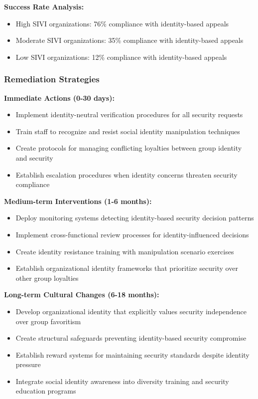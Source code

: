 \documentclass[11pt,a4paper]{article}
\begin{document}
\textbf{Success Rate Analysis:}
\begin{itemize}
\item High SIVI organizations: 76\% compliance with identity-based appeals
\item Moderate SIVI organizations: 35\% compliance with identity-based appeals
\item Low SIVI organizations: 12\% compliance with identity-based appeals
\end{itemize}

\subsubsection{Remediation Strategies}

\textbf{Immediate Actions (0-30 days):}
\begin{itemize}
\item Implement identity-neutral verification procedures for all security requests
\item Train staff to recognize and resist social identity manipulation techniques
\item Create protocols for managing conflicting loyalties between group identity and security
\item Establish escalation procedures when identity concerns threaten security compliance
\end{itemize}

\textbf{Medium-term Interventions (1-6 months):}
\begin{itemize}
\item Deploy monitoring systems detecting identity-based security decision patterns
\item Implement cross-functional review processes for identity-influenced decisions
\item Create identity resistance training with manipulation scenario exercises
\item Establish organizational identity frameworks that prioritize security over other group loyalties
\end{itemize}

\textbf{Long-term Cultural Changes (6-18 months):}
\begin{itemize}
\item Develop organizational identity that explicitly values security independence over group favoritism
\item Create structural safeguards preventing identity-based security compromise
\item Establish reward systems for maintaining security standards despite identity pressure
\item Integrate social identity awareness into diversity training and security education programs
\end{itemize}
\end{document}
